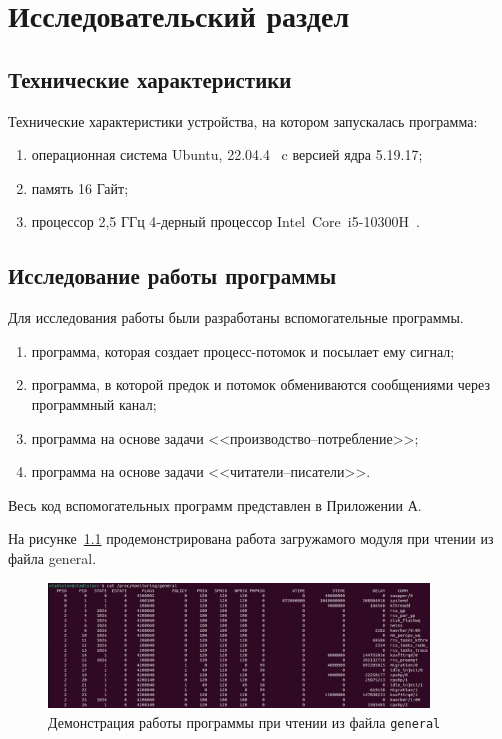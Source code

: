 \chapter{Исследовательский раздел}

\section{Технические характеристики}

Технические характеристики устройства, на котором запускалась программа:

\begin{enumerate}
	\item операционная система Ubuntu, 22.04.4~\cite{ubuntu} c версией ядра 5.19.17;
	\item память 16 Гайт;
	\item процессор 2,5 ГГц 4‑дерный процессор Intel Core i5-10300H~\cite{intel}.
\end{enumerate}

\section{Исследование работы программы}

Для исследования работы были разработаны вспомогательные программы.

\begin{enumerate}
	\item программа, которая создает процесс-потомок и посылает ему сигнал;
	\item программа, в которой предок и потомок обмениваются сообщениями через программный канал;
	\item программа на основе задачи <<производство--потребление>>;
	\item программа на основе задачи <<читатели--писатели>>.
\end{enumerate}

Весь код вспомогательных программ представлен в Приложении А.

На рисунке~\ref{img:example-general} продемонстрирована работа загружамого модуля при чтении из файла general.

\begin{figure}[h]
	\centering
	\includegraphics[width=0.9\textwidth]{img/example-general}
	\caption{Демонстрация работы программы при чтении из файла \texttt{general}}
	\label{img:example-general}
\end{figure}

